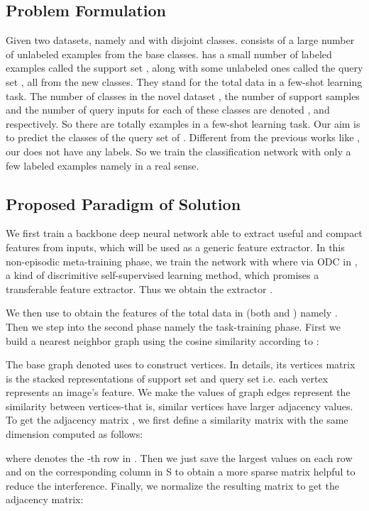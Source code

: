 \documentclass[conference]{IEEEtran}
\begin{document}
\subsection{Problem Formulation}\label{3.1}
Given two datasets, namely  and  with disjoint classes.  consists of a large number of unlabeled examples from the base classes.  has a small number of labeled examples called the support set , along with some unlabeled ones called the query set , all from the new classes. They stand for the total data in a few-shot learning task. The number of classes in the novel dataset , the number of support samples and the number of query inputs for each of these classes are denoted ,  and  respectively. So there are totally  examples in a few-shot learning task. Our aim is to predict the classes of the query set of . 
Different from the previous works like \cite{ravi2016optimization}, our  does not have any labels. So we train the classification network with only a few labeled examples namely  in a real sense.

\subsection{Proposed Paradigm of Solution}\label{3.2}
We first train a backbone deep neural network able to extract useful and compact features from inputs, which will be used as a generic feature extractor. In this non-episodic meta-training phase, we train the network with   where  via ODC in \cite{tian2019contrastive}, a kind of discrimitive self-supervised learning method,  which promises a transferable feature extractor. Thus we obtain the extractor .

We then use  to obtain the features of the total data in  (both  and ) namely . Then we step into the second phase namely the task-training phase. First we build a nearest neighbor graph using the cosine similarity according to \cite{hu2020exploiting} :

The base graph denoted  uses  to construct vertices. In details, its vertices matrix  is the stacked representations of support set and query set i.e. each vertex represents an image's feature. We make the values of graph edges represent the similarity between vertices-that is, similar vertices have larger adjacency values. To get the adjacency matrix , we first define a similarity matrix  with the same dimension computed as follows:

where  denotes the  -th row in . Then we just save the  largest values on each row and on the corresponding column in S to obtain a more sparse matrix helpful to reduce the interference. Finally, we normalize the resulting matrix to get the adjacency matrix:
\end{document}

